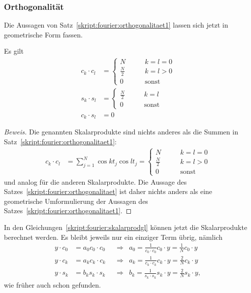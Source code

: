 \subsubsection{Orthogonalität}
Die Aussagen von Satz~\ref{skript:fourier:orthogonalitaet1}
lassen sich jetzt in geometrische Form fassen.
\begin{satz}
Es gilt
\begin{align*}
c_k\cdot c_l
&=
\begin{cases}
N&\qquad k=l=0\\
\displaystyle\frac{N}2&\qquad k=l>0\\
0&\qquad\text{sonst}
\end{cases}
\\
s_k\cdot s_l
&=
\begin{cases}
\displaystyle\frac{N}2&\qquad k=l\\
0&\qquad\text{sonst}
\end{cases}
\\
c_k\cdot s_l
&=
0
\end{align*}
\label{skript:fourier:orthogonalitaet}
\end{satz}

\begin{proof}[Beweis]
Die genannten Skalarprodukte sind nichts anderes als die Summen in
Satz~\ref{skript:fourier:orthogonalitaet1}:
\begin{align*}
c_k\cdot c_l
&=
\sum_{j=1}^N \cos kt_j \cos lt_j
=
\begin{cases}
N&\qquad k=l=0\\
\displaystyle\frac{N}2&\qquad k=l>0\\
0&\qquad\text{sonst}
\end{cases}
\end{align*}
und analog für die anderen Skalarprodukte.
Die Aussage des Satzes~\ref{skript:fourier:orthogonalitaet}
ist daher nichts anders als eine geometrische
Umformulierung der Aussagen des
Satzes~\ref{skript:fourier:orthogonalitaet1}.
\end{proof}

In den Gleichungen~\eqref{skript:fourier:skalarprodgl} können jetzt
die Skalarprodukte berechnet werden.
Es bleibt jeweils nur ein einziger Term übrig, nämlich
\begin{equation*}
\begin{aligned}
y\cdot c_0 &= a_0 c_0\cdot c_0
&&\Rightarrow&
a_0 = \frac{1}{c_0\cdot c_0}c_0\cdot y = \frac1N c_0\cdot y
\\
y\cdot c_k &= a_k c_k\cdot c_k
&&\Rightarrow&
a_k = \frac{1}{c_k\cdot c_k}c_k\cdot y = \frac2N c_k\cdot y
\\
y\cdot s_k &= b_k s_k\cdot s_k
&&\Rightarrow&
b_k = \frac{1}{s_k\cdot s_k}s_k\cdot y = \frac2N s_k\cdot y,
\end{aligned}
\end{equation*}
wie früher auch schon gefunden.

